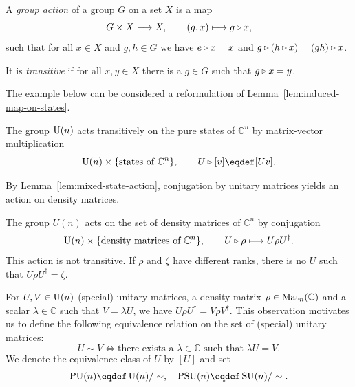\documentclass[a4paper, oneside, 12pt]{amsart}
\begin{document}
\begin{definition}\label{def:group-action}
  A \emph{group action} of a group \( G \) on a set \( X \) is a map
  \begin{equation*}
    G \times X \to X, \qquad (g, x) \mapsto g \lact x,
  \end{equation*}
  such that for all \(x\in X\) and \(g,h \in G\) we have \( e \lact x = x \) and \( g \lact (h \lact x) = (gh) \lact x \).

  It is \emph{transitive} if for all \(x, y\in X\) there is a \(g \in G\) such that \(g\lact x = y\).
\end{definition}

The example below can be considered a reformulation of Lemma~\ref{lem:induced-map-on-states}.

\begin{example}\label{ex:states}
  The group \(\operatorname{U}(n) \) acts transitively on the pure states of \( \mathbb{C}^n \) by matrix-vector multiplication
  \begin{equation*}
    \U(n) \times\{\text{states of } \mathbb{C}^{n}\}, \qquad   U\lact [v] \eqdef [Uv].
  \end{equation*}
\end{example}

By Lemma~\ref{lem:mixed-state-action}, conjugation by unitary matrices yields an action on density matrices.

\begin{example}\label{ex:group-action-on-mixed-states}
  The group \( U(n) \) acts on the set of density matrices of \( \mathbb{C}^n \) by conjugation
  \begin{equation*}
    \U(n) \times\{\text{density matrices of } \mathbb{C}^{n}\}, \qquad
    U\lact \rho \mapsto U\rho U^{\dagger}.
  \end{equation*}
  This action is not transitive.
  If \(\rho\) and \(\zeta\) have different ranks, there is no  \(U\) such that \(U\rho U^{\dagger} = \zeta\).
\end{example}

For \(U, V \in \operatorname{U}(n)\) (special) unitary matrices, a density matrix  \(\rho \in \operatorname{Mat}_{n}( \mathbb{C})\) and a scalar \(\lambda \in \mathbb{C}\) such that \(V= \lambda U\),
we have \(U\rho U^{\dagger} = V \rho V^{\dagger}\).
This observation motivates us to define the following equivalence relation on the set of (special) unitary matrices:
\begin{equation}
  U\sim V \iff \text{there exists a } \lambda \in \mathbb{C} \text{ such that } \lambda U= V.
\end{equation}
We denote the equivalence class of \( U \) by \( [U] \) and set
\begin{equation*}
  \mathrm{PU}(n) \eqdef \U(n)/\sim, \quad \mathrm{PSU}(n) \eqdef \SU(n)/\sim.
\end{equation*}
\end{document}
